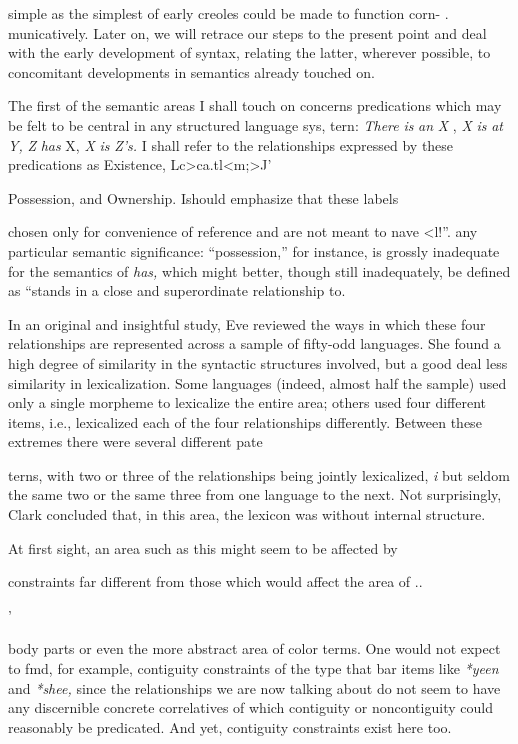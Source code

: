 simple as the simplest of early creoles could be made to function corn- . municatively. Later on, we will retrace our steps to the present point and deal with the early development of syntax, relating the latter, wherever possible, to concomitant developments in semantics already touched on.

The first of the semantic areas I shall touch on concerns predica\-tions which may be felt to be central in any structured language sys, tern: \textit{There }\textit{is} \textit{an} \textit{X} , \textit{X }\textit{is }\textit{at }\textit{Y,} \textit{Z }\textit{has} X, \textit{X }\textit{is} \textit{Z's. }I shall refer to the relationships expressed by these predications as Existence, Lc{\textgreater}ca.tl{\textless}m;{\textgreater}J'

Possession, and Ownership. Ishould emphasize that these labels

chosen only for convenience of reference and are not meant to nave {\textless}l!''. any particular semantic significance: ``possession,'' for instance, is grossly inadequate for the semantics of \textit{has,} which might better, though still inadequately, be defined as ``stands in a close and superordinate relationship to.{\textquotedbl}

In an original and insightful study, Eve \citet{Clark1970} reviewed the ways in which these four relationships are represented across a sample of fifty-odd languages. She found a high degree of similarity in the syntactic structures involved, but a good deal less similarity in lexicalization. Some languages (indeed, almost half the sample) used only a single morpheme to lexicalize the entire area; others used four different items, i.e., lexicalized each of the four relationships differently. Between these extremes there were several different pate

terns, with two or three of the relationships being jointly lexicalized, \textit{i} but seldom the same two or the same three from one language to the next. Not surprisingly, Clark concluded that, in this area, the lexicon was without internal structure.

At first sight, an area such as this might seem to be affected by

constraints far different from those which would affect the area of ..

'


body parts or even the more abstract area of color terms. One would not expect to fmd, for example, contiguity constraints of the type that bar items like \textit{*yeen} and \textit{*shee,} since the relationships we are now talking about do not seem to have any discernible concrete correlatives of which contiguity or noncontiguity could reasonably be predicated. And yet, contiguity constraints exist here too.


